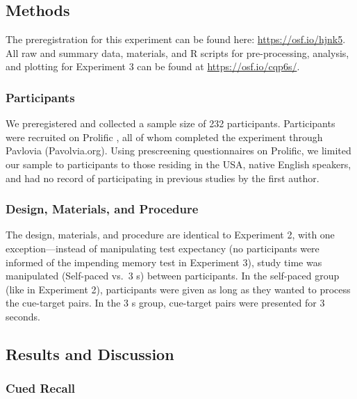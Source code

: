 \documentclass[
  english,
  jou]{apa7}
\begin{document}
\hypertarget{methods-1}{%
\subsection{Methods}\label{methods-1}}

The preregistration for this experiment can be found here: \url{https://osf.io/hjnk5}. All raw and summary data, materials, and R scripts for pre-processing, analysis, and plotting for Experiment 3 can be found at \url{https://osf.io/cqp6s/}.

\hypertarget{participants-2}{%
\subsubsection{Participants}\label{participants-2}}

We preregistered and collected a sample size of 232 participants. Participants were recruited on Prolific , all of whom completed the experiment through Pavlovia (Pavolvia.org). Using prescreening questionnaires on Prolific, we limited our sample to participants to those residing in the USA, native English speakers, and had no record of participating in previous studies by the first author.

\hypertarget{design-materials-and-procedure}{%
\subsubsection{Design, Materials, and Procedure}\label{design-materials-and-procedure}}

The design, materials, and procedure are identical to Experiment 2, with one exception---instead of manipulating test expectancy (no participants were informed of the impending memory test in Experiment 3), study time was manipulated (Self-paced vs.~3 s) between participants. In the self-paced group (like in Experiment 2), participants were given as long as they wanted to process the cue-target pairs. In the 3 s group, cue-target pairs were presented for 3 seconds.

\hypertarget{results-and-discussion-2}{%
\subsection{Results and Discussion}\label{results-and-discussion-2}}

\hypertarget{cued-recall-1}{%
\subsubsection{Cued Recall}\label{cued-recall-1}}
\end{document}
